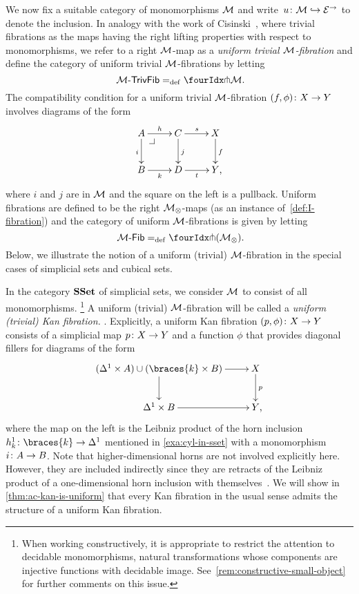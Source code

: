 \documentclass[reqno,10pt,a4paper,oneside,draft]{amsart}
\begin{document}
We now fix a suitable category of monomorphisms $\cal{M}$ and write~$u \co \cal{M} \hookrightarrow \catE^\to$ to denote the inclusion.
In analogy with the work of Cisinski~\cite{cisinski-asterisque}, where trivial fibrations as the maps having the right lifting properties with respect to monomorphisms, we refer to a right $\cal{M}$-map as a \emph{uniform trivial $\cal{M}$-fibration} and define the category of uniform trivial $\cal{M}$-fibrations by letting
\[
  \TrivFib{\cal{M}} \defeq \liftr{\cal{M}} \rlap{.}
\]
The compatibility condition for a uniform trivial $\cal{M}$-fibration $(f, \phi) \co X \to Y$ involves diagrams of the form
\[
\xymatrix{
  A
  \ar[r]^{h}
  \ar[d]_{i}
  \pullback{dr}
&
  C \ar[d]^{j}
  \ar[r]^{s}
&
  X \ar[d]^f
\\
  B
  \ar[r]_{k}
&
  D \ar[r]_{t}
&
  Y
\rlap{,}}
\]
where $i$ and $j$ are in $\cal{M}$ and the square on the left is a pullback.
Uniform fibrations are defined to be the right $\cal{M}_\otimes$-maps (as an instance of~\cref{def:I-fibration}) and the category of uniform $\cal{M}$-fibrations is given by letting
\[
  \Fib{\cal{M}} \defeq \liftr{(\cal{M}_\otimes)} \rlap{.}
\]
Below, we illustrate the notion of a uniform (trivial) $\cal{M}$-fibration in the special cases of simplicial sets and cubical sets.

\begin{example}
In the category $\SSet$ of simplicial sets, we consider $\cal{M}$ to consist of all monomorphisms.%
\footnote{
When working constructively, it is appropriate to restrict the attention to decidable monomorphisms, \ie natural transformations whose components are injective functions with decidable image.
See~\cref{rem:constructive-small-object} for further comments on this issue.} A uniform (trivial) $\cal{M}$-fibration will be called a \emph{uniform (trivial) Kan fibration.
}.
Explicitly, a uniform Kan fibration $(p, \phi) \co X \to Y$ consists of a simplicial map $p \co X \to Y$ and a function $\phi$ that provides diagonal fillers for diagrams of the form
\[
\xymatrix{
  (\Delta^1 \times A) \cup (\braces{k} \times B)
  \ar[r]
  \ar[d]
&
  X
  \ar[d]^{p}
\\
  \Delta^1 \times B
  \ar[r]
&
  Y
\rlap{,}}
\]
where the map on the left is the Leibniz product of the horn inclusion $h_k^1 \co \braces{k} \to \Delta^1$ mentioned in \cref{exa:cyl-in-sset} with a monomorphism $i \co A \to B$.
Note that higher-dimensional horns are not involved explicitly here.
However, they are included indirectly since they are retracts of the Leibniz product of a one-dimensional horn inclusion with themselves~\cite[Chap.~IV, Sec.~2]{gabriel-zisman:calculus-of-fractions}.
We will show in \cref{thm:ac-kan-is-uniform} that every Kan fibration in the usual sense admits the structure of a uniform Kan fibration.
\end{example}
\end{document}
